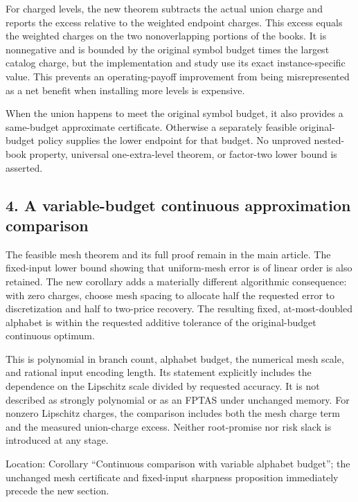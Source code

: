 \documentclass[11pt,letterpaper]{article}
\begin{document}
For charged levels, the new theorem subtracts the actual union charge and reports the excess relative to the weighted endpoint charges. This excess equals the weighted charges on the two nonoverlapping portions of the books. It is nonnegative and is bounded by the original symbol budget times the largest catalog charge, but the implementation and study use its exact instance-specific value. This prevents an operating-payoff improvement from being misrepresented as a net benefit when installing more levels is expensive.



When the union happens to meet the original symbol budget, it also provides a same-budget approximate certificate. Otherwise a separately feasible original-budget policy supplies the lower endpoint for that budget. No unproved nested-book property, universal one-extra-level theorem, or factor-two lower bound is asserted.



\subsection*{4. A variable-budget continuous approximation comparison}


The feasible mesh theorem and its full proof remain in the main article. The fixed-input lower bound showing that uniform-mesh error is of linear order is also retained. The new corollary adds a materially different algorithmic consequence: with zero charges, choose mesh spacing to allocate half the requested error to discretization and half to two-price recovery. The resulting fixed, at-most-doubled alphabet is within the requested additive tolerance of the original-budget continuous optimum.



This is polynomial in branch count, alphabet budget, the numerical mesh scale, and rational input encoding length. Its statement explicitly includes the dependence on the Lipschitz scale divided by requested accuracy. It is not described as strongly polynomial or as an FPTAS under unchanged memory. For nonzero Lipschitz charges, the comparison includes both the mesh charge term and the measured union-charge excess. Neither root-promise nor risk slack is introduced at any stage.



Location: Corollary “Continuous comparison with variable alphabet budget”; the unchanged mesh certificate and fixed-input sharpness proposition immediately precede the new section.
\end{document}
